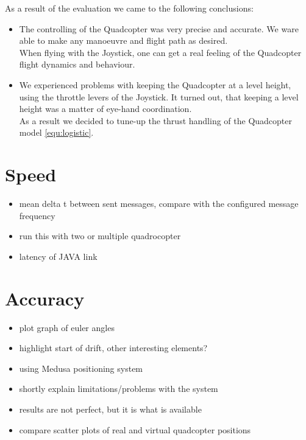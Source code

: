 As a result of the evaluation we came to the following conclusions:

\begin{itemize}
\item{The controlling of the Quadcopter was very precise and accurate. We ware able to make any manoeuvre and flight path as desired. \\ When flying with the Joystick, one can get a real feeling
of the Quadcopter flight dynamics and behaviour}.

\item{We experienced problems with keeping the Quadcopter at a level height, using the throttle levers of the Joystick. It turned out, that keeping a level height was a matter of eye-hand coordination. \\
As a result we decided to tune-up the thrust handling of the Quadcopter model \ref{equ:logistic}}.

\end{itemize}

\section{Speed}


\begin{itemize}

\item{mean delta t between sent messages, compare with the configured message frequency}
\item{ run this with two or multiple quadrocopter}
\item{latency of JAVA link}
\end{itemize}




\section{Accuracy}
\begin{itemize}
\item{plot graph of euler angles}
\item{highlight start of drift, other interesting elements?}
\end{itemize}
\begin{itemize}

\item{using Medusa positioning system}
\item{shortly explain limitations/problems with the system}
\item{results are not perfect, but it is what is available}
\item{compare scatter plots of real and virtual quadcopter positions}
\end{itemize}

